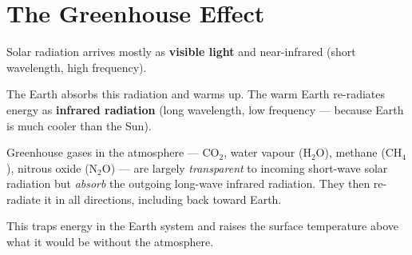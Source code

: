 \section{The Greenhouse Effect}

\begin{processbox}
Solar radiation arrives mostly as \textbf{visible
light} and near-infrared (short wavelength, high
frequency).

The Earth absorbs this radiation and warms up. The
warm Earth re-radiates energy as \textbf{infrared
radiation} (long wavelength, low frequency ---
because Earth is much cooler than the Sun).

Greenhouse gases in the atmosphere ---
CO$_2$, water vapour (H$_2$O), methane (CH$_4$),
nitrous oxide (N$_2$O) --- are largely
\textit{transparent} to incoming short-wave solar
radiation but \textit{absorb} the outgoing long-wave
infrared radiation. They then re-radiate it in all
directions, including back toward Earth.

This traps energy in the Earth system and raises
the surface temperature above what it would be
without the atmosphere.
\end{processbox}

